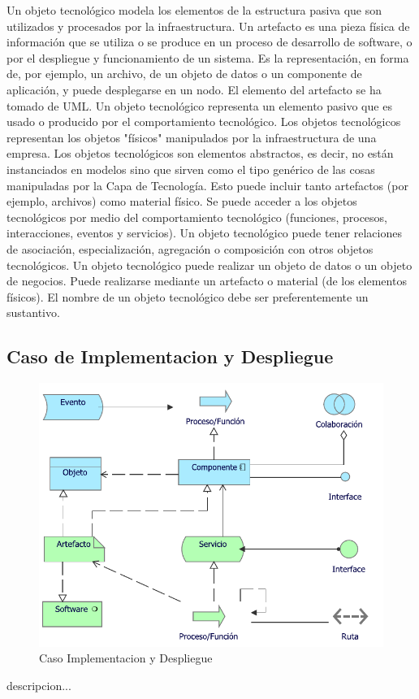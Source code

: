 Un objeto tecnológico modela los elementos de la estructura pasiva que son utilizados y procesados por la infraestructura. Un artefacto es una pieza física de información que se utiliza o se produce en un proceso de desarrollo de software, o por el despliegue y funcionamiento de un sistema. Es la representación, en forma de, por ejemplo, un archivo, de un objeto de datos o un componente de aplicación, y puede desplegarse en un nodo. El elemento del artefacto se ha tomado de UML. Un objeto tecnológico representa un elemento pasivo que es usado o producido por el comportamiento tecnológico. Los objetos tecnológicos representan los objetos "físicos" manipulados por la infraestructura de una empresa. Los objetos tecnológicos son elementos abstractos, es decir, no están instanciados en modelos sino que sirven como el tipo genérico de las cosas manipuladas por la Capa de Tecnología. Esto puede incluir tanto artefactos (por ejemplo, archivos) como material físico.
Se puede acceder a los objetos tecnológicos por medio del comportamiento tecnológico (funciones, procesos, interacciones, eventos y servicios). Un objeto tecnológico puede tener relaciones de asociación, especialización, agregación o composición con otros objetos tecnológicos. Un objeto tecnológico puede realizar un objeto de datos o un objeto de negocios. Puede realizarse mediante un artefacto o material (de los elementos físicos). El nombre de un objeto tecnológico debe ser preferentemente un sustantivo.

\newpage

\subsection{Caso  de Implementacion y Despliegue}
\begin{figure}[h!]
	\centering
	\includegraphics[width=.7\linewidth]{imgs/caso/Implementacion}
	\caption{Caso Implementacion y Despliegue}
\end{figure}
descripcion...
